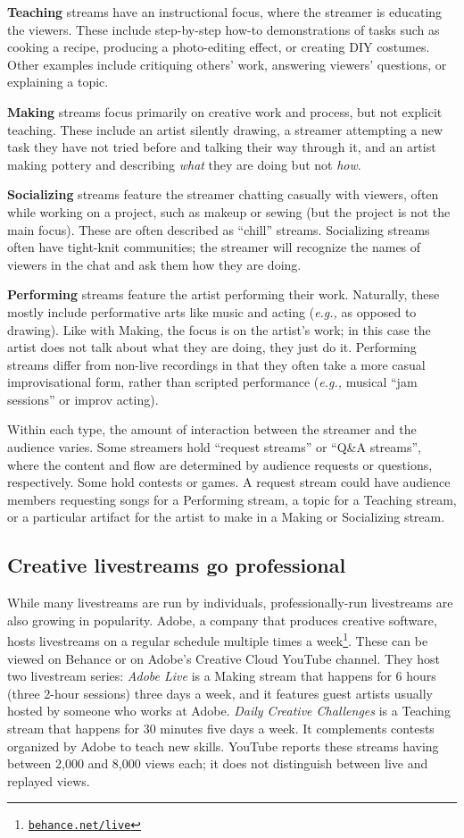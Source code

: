 \textbf{Teaching} streams have an instructional focus, where the stream\-er is educating the viewers. These include step-by-step how-to demonstrations of tasks such as cooking a recipe, producing a photo-editing effect, or creating DIY costumes. Other examples include critiquing others' work, answering viewers' questions, or explaining a topic.

\textbf{Making} streams focus primarily on creative work and process, but not explicit teaching. These include an artist silently drawing, a streamer attempting a new task they have not tried before and talking their way through it, and an artist making pottery and describing \textit{what} they are doing but not \textit{how}. 

\textbf{Socializing} streams feature the streamer chatting casually with viewers, often while working on a project, such as makeup or sewing (but the project is not the main focus). These are often described as ``chill'' streams. Socializing streams often have tight-knit communities; the streamer will recognize the names of viewers in the chat and ask them how they are doing.

\textbf{Performing} streams feature the artist performing their work. Naturally, these mostly include performative arts like music and acting (\textit{e.g.,} as opposed to drawing). Like with Making, the focus is on the artist's work; in this case the artist does not talk about what they are doing, they just do it. Performing streams differ from non-live recordings in that they often take a more casual improvisational form, rather than scripted performance (\textit{e.g.,} musical ``jam sessions'' or improv acting).

Within each type, the amount of interaction between the stream\-er and the audience varies. Some streamers hold ``request streams'' or ``Q\&A streams'', where the content and flow are determined by audience requests or questions, respectively. Some hold contests or games. A request stream could have audience members requesting songs for a Performing stream, a topic for a Teaching stream, or a particular artifact for the artist to make in a Making or Socializing stream. 

\subsection{Creative livestreams go professional}
While many livestreams are run by individuals, professionally-run livestreams are also growing in popularity. Adobe, a company that produces creative software, hosts livestreams on a regular schedule multiple times a week\footnote{\href{https://behance.net/live}{\nolinkurl{behance.net/live}}}. These can be viewed on Behance or on Adobe's Creative Cloud YouTube channel. They host two livestream series: \textit{Adobe Live} is a Making stream that happens for 6 hours (three 2-hour sessions) three days a week, and it features guest artists usually hosted by someone who works at Adobe. \textit{Daily Creative Challenges} is a Teaching stream that happens for 30 minutes five days a week. It complements contests organized by Adobe to teach new skills. YouTube reports these streams having between 2,000 and 8,000 views each; it does not distinguish between live and replayed views.

